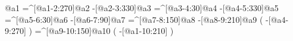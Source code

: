                     @{a1}%
     =^[@{a1-2}:270]@{a2}%
      -[@{a2-3}:330]@{a3}%
      =^[@{a3-4}:30]@{a4}%
      -[@{a4-5}:330]@{a5}%
      =^[@{a5-6}:30]@{a6}%
       -[@{a6-7}:90]@{a7}%
     =^[@{a7-8}:150]@{a8}%
      -[@{a8-9}:210]@{a9}%
                       (
          -[@{a4-9}:270]%
                       )
    =^[@{a9-10}:150]@{a10}%
                       (
         -[@{a1-10}:210]%
                       )